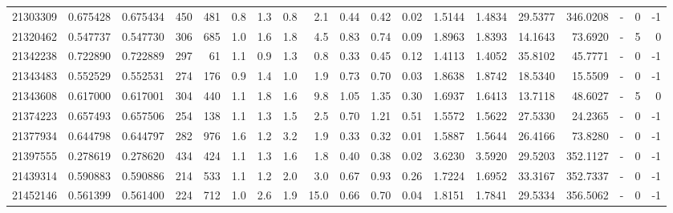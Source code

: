 \begin{tabular}{rrrrrrrrrrrrrrrrlrr}
  21303309 & 0.675428 &   0.675434 &  450 &  481 &      0.8 &      1.3 &     0.8 &      2.1 &       0.44 &        0.42 &        0.02 &  1.5144 &  1.4834 &   29.5377 &  346.0208 &             - &        0 &         -1 \\
  21320462 & 0.547737 &   0.547730 &  306 &  685 &      1.0 &      1.6 &     1.8 &      4.5 &       0.83 &        0.74 &        0.09 &  1.8963 &  1.8393 &   14.1643 &   73.6920 &             - &        5 &          0 \\
  21342238 & 0.722890 &   0.722889 &  297 &   61 &      1.1 &      0.9 &     1.3 &      0.8 &       0.33 &        0.45 &        0.12 &  1.4113 &  1.4052 &   35.8102 &   45.7771 &             - &        0 &         -1 \\
  21343483 & 0.552529 &   0.552531 &  274 &  176 &      0.9 &      1.4 &     1.0 &      1.9 &       0.73 &        0.70 &        0.03 &  1.8638 &  1.8742 &   18.5340 &   15.5509 &             - &        0 &         -1 \\
  21343608 & 0.617000 &   0.617001 &  304 &  440 &      1.1 &      1.8 &     1.6 &      9.8 &       1.05 &        1.35 &        0.30 &  1.6937 &  1.6413 &   13.7118 &   48.6027 &             - &        5 &          0 \\
  21374223 & 0.657493 &   0.657506 &  254 &  138 &      1.1 &      1.3 &     1.5 &      2.5 &       0.70 &        1.21 &        0.51 &  1.5572 &  1.5622 &   27.5330 &   24.2365 &             - &        0 &         -1 \\
  21377934 & 0.644798 &   0.644797 &  282 &  976 &      1.6 &      1.2 &     3.2 &      1.9 &       0.33 &        0.32 &        0.01 &  1.5887 &  1.5644 &   26.4166 &   73.8280 &             - &        0 &         -1 \\
  21397555 & 0.278619 &   0.278620 &  434 &  424 &      1.1 &      1.3 &     1.6 &      1.8 &       0.40 &        0.38 &        0.02 &  3.6230 &  3.5920 &   29.5203 &  352.1127 &             - &        0 &         -1 \\
  21439314 & 0.590883 &   0.590886 &  214 &  533 &      1.1 &      1.2 &     2.0 &      3.0 &       0.67 &        0.93 &        0.26 &  1.7224 &  1.6952 &   33.3167 &  352.7337 &             - &        0 &         -1 \\
  21452146 & 0.561399 &   0.561400 &  224 &  712 &      1.0 &      2.6 &     1.9 &     15.0 &       0.66 &        0.70 &        0.04 &  1.8151 &  1.7841 &   29.5334 &  356.5062 &             - &        0 &         -1 \\

\end{tabular}
